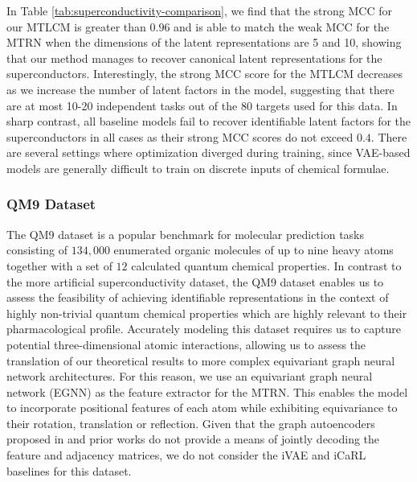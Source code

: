 \documentclass[10pt]{article} %
\theoremstyle{plain}
\theoremstyle{definition}
\begin{document}
In Table \ref{tab:superconductivity-comparison}, we find that the strong MCC for our MTLCM is greater than $0.96$ and is able to match the weak MCC for the MTRN when the dimensions of the latent representations are 5 and 10, showing that our method manages to recover canonical latent representations for the superconductors. Interestingly, the strong MCC score for the MTLCM decreases as we increase the number of latent factors in the model, suggesting that there are at most 10-20 independent tasks out of the 80 targets used for this data. In sharp contrast, all baseline models fail to recover identifiable latent factors for the superconductors in all cases as their strong MCC scores do not exceed $0.4$. There are several settings where optimization diverged during training, since VAE-based models are generally difficult to train on discrete inputs of chemical formulae.

\subsubsection{QM9 Dataset}
The QM9 dataset \citep{qm9, qm9_2} is a popular benchmark for molecular prediction tasks consisting of $134,000$ enumerated organic molecules of up to nine heavy atoms together with a set of $12$ calculated quantum chemical properties. 
In contrast to the more artificial superconductivity dataset, the QM9 dataset enables us to assess the feasibility of achieving identifiable representations in the context of highly non-trivial quantum chemical properties which are highly relevant to their pharmacological profile.
Accurately modeling this dataset requires us to capture potential three-dimensional atomic interactions, allowing us to assess the translation of our theoretical results to more complex equivariant graph neural network architectures.  For this reason, we use an equivariant graph neural network (EGNN) \citep{egnn} as the feature extractor for the MTRN. This enables the model to incorporate positional features of each atom while exhibiting equivariance to their rotation, translation or reflection. Given that the graph autoencoders proposed in \citet{egnn} and prior works \citep{Kipf_Welling_2016, Simonovsky_Komodakis_2018, Liu_Kumar_Ba_Kiros_Swersky_2019} do not provide a means of jointly decoding the feature and adjacency matrices, we do not consider the iVAE and iCaRL baselines for this dataset.
\end{document}
